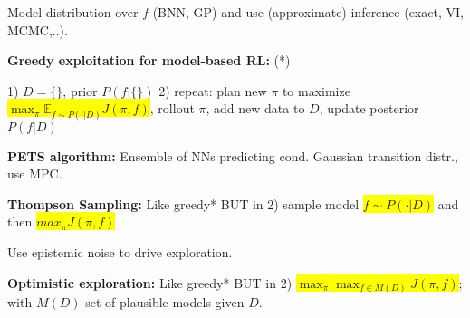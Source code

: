 \documentclass[11pt,landscape,a4paper,fleqn]{article}
\newcommand{\mhl}[1]{\setlength{\fboxsep}{0pt}\colorbox{yellow}{#1}}
\begin{document}
\begin{multicols*}{4}
Model distribution over $f$ (BNN, GP) and use (approximate) inference (exact, VI, MCMC,..).

\textbf{Greedy exploitation for model-based RL:} \textcolor{mypink}{(*)}

1) $D=\{\}$, prior $P(f|\{\})$ 2) repeat: plan new $\pi$ to maximize \mhl{$\max_\pi \mathbb{E}_{f \sim P(\cdot | D)} J(\pi, f)$}, rollout $\pi$, add new data to $D$, update posterior $P(f | D)$

\textbf{PETS algorithm:} Ensemble of NNs predicting cond. Gaussian transition distr., use MPC.

\textbf{Thompson Sampling:} Like greedy\textcolor{mypink}{*} BUT in 2) sample model \mhl{$f \sim P(\cdot | D)$} and then \mhl{$max_\pi J(\pi, f)$}

Use epistemic noise to drive exploration.

\textbf{Optimistic exploration:} Like greedy\textcolor{mypink}{*} BUT in 2) \mhl{$\max_\pi \max_{f \in M(D)} J(\pi, f)$}; with $M(D)$ set of plausible models given $D$.




\end{multicols*}
\end{document}
